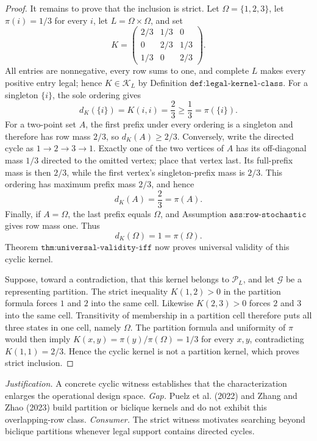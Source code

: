\documentclass{article}
\begin{document}
\begin{proof}
It remains to prove that the inclusion is strict.  Let \(\Omega=\{1,2,3\}\), let \(\pi(i)=1/3\) for every \(i\), let \(L=\Omega\times\Omega\), and set
\[
K=\begin{pmatrix}
2/3&1/3&0\\
0&2/3&1/3\\
1/3&0&2/3
\end{pmatrix}.
\]
All entries are nonnegative, every row sums to one, and complete \(L\) makes every positive entry legal; hence \(K\in\mathcal K_L\) by Definition \(\texttt{def:legal-kernel-class}\).  For a singleton \(\{i\}\), the sole ordering gives
\[
d_K(\{i\})=K(i,i)=\frac23\geq\frac13=\pi(\{i\}).
\]
For a two-point set \(A\), the first prefix under every ordering is a singleton and therefore has row mass \(2/3\), so \(d_K(A)\geq2/3\).  Conversely, write the directed cycle as \(1\to2\to3\to1\).  Exactly one of the two vertices of \(A\) has its off-diagonal mass \(1/3\) directed to the omitted vertex; place that vertex last.  Its full-prefix mass is then \(2/3\), while the first vertex's singleton-prefix mass is \(2/3\).  This ordering has maximum prefix mass \(2/3\), and hence
\[
d_K(A)=\frac23=\pi(A).
\]
Finally, if \(A=\Omega\), the last prefix equals \(\Omega\), and Assumption \(\texttt{ass:row-stochastic}\) gives row mass one.  Thus
\[
d_K(\Omega)=1=\pi(\Omega).
\]
Theorem \(\texttt{thm:universal-validity-iff}\) now proves universal validity of this cyclic kernel.

Suppose, toward a contradiction, that this kernel belongs to \(\mathcal P_L\), and let \(\mathcal G\) be a representing partition.  The strict inequality \(K(1,2)>0\) in the partition formula forces \(1\) and \(2\) into the same cell.  Likewise \(K(2,3)>0\) forces \(2\) and \(3\) into the same cell.  Transitivity of membership in a partition cell therefore puts all three states in one cell, namely \(\Omega\).  The partition formula and uniformity of \(\pi\) would then imply \(K(x,y)=\pi(y)/\pi(\Omega)=1/3\) for every \(x,y\), contradicting \(K(1,1)=2/3\).  Hence the cyclic kernel is not a partition kernel, which proves strict inclusion.
\end{proof}
\par\smallskip\noindent \textit{Justification.} A concrete cyclic witness establishes that the characterization enlarges the operational design space. \textit{Gap.} Puelz et al. (2022) and Zhang and Zhao (2023) build partition or biclique kernels and do not exhibit this overlapping-row class. \textit{Consumer.} The strict witness motivates searching beyond biclique partitions whenever legal support contains directed cycles.
\end{document}
